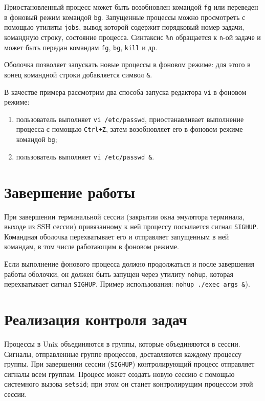\documentclass[listings]{labreport}
\begin{document}
Приостановленный процесс может быть возобновлен командой \texttt{fg} или переведен в фоновый режим командой \texttt{bg}. Запущенные
процессы можно просмотреть с помощью утилиты \texttt{jobs}, вывод которой содержит порядковый номер задачи, командную строку, состояние процесса.
Синтаксис \texttt{\%n} обращается к \texttt{n}-ой задаче и может быть передан командам \texttt{fg}, \texttt{bg}, \texttt{kill} и др.

Оболочка позволяет запускать новые процессы в фоновом режиме: для этого в конец командной строки добавляется символ \texttt{\&}.

В качестве примера рассмотрим два способа запуска редактора \texttt{vi} в фоновом режиме:
\begin{enumerate}
\item пользователь выполняет \texttt{vi /etc/passwd}, приостанавливает выполнение процесса с помощью \texttt{Ctrl+Z},
затем возобновляет его в фоновом режиме командой \texttt{bg};
\item пользователь выполняет \texttt{vi /etc/passwd \&}.
\end{enumerate}

\section*{Завершение работы}

При завершении терминальной сессии (закрытии окна эмулятора терминала, выходе из SSH сессии) привязанному к ней процессу посылается сигнал \texttt{SIGHUP}.
Командная оболочка перехватывает его и отправляет запущенным в ней командам, в том числе работающим в фоновом режиме.

Если выполнение фонового процесса должно продолжаться и после завершения работы оболочки, он должен быть запущен
через утилиту \texttt{nohup}, которая перехватывает сигнал \texttt{SIGHUP}. Пример использования: \texttt{nohup ./exec args \&}).

\section*{Реализация контроля задач}

Процессы в Unix объединяются в группы, которые объединяются в сессии. Сигналы, отправленные группе процессов,
доставляются каждому процессу группы. При завершении сессии (\texttt{SIGHUP}) контролирующий процесс отправляет сигналы всем группам.
Процесс может создать новую сессию с помощью системного вызова \texttt{setsid}; при этом он станет контролирущим процессом этой сессии.
\end{document}
